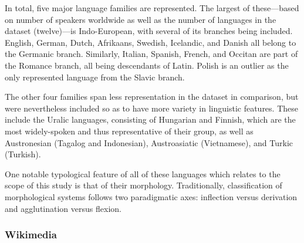 \documentclass[12pt,a4paper]{article}
\numberwithin{figure}{section}
\numberwithin{table}{section}
\numberwithin{definition}{section}
\begin{document}

In total, five major language families are represented. The largest of these---based on number of speakers worldwide as well as the number of languages in the dataset (twelve)---is Indo-European, with several of its branches being included. English, German, Dutch, Afrikaans, Swedish, Icelandic, and Danish all belong to the Germanic branch. Similarly, Italian, Spanish, French, and Occitan are part of the Romance branch, all being descendants of Latin. Polish is an outlier as the only represented language from the Slavic branch. 

The other four families span less representation in the dataset in comparison, but were nevertheless included so as to have more variety in linguistic features. These include the Uralic languages, consisting of Hungarian and Finnish, which are the most widely-spoken and thus representative of their group, as well as Austronesian (Tagalog and Indonesian), Austroasiatic (Vietnamese), and Turkic (Turkish). 

One notable typological feature of all of these languages which relates to the scope of this study is that of their morphology. Traditionally, classification of morphological systems follows two paradigmatic axes: inflection versus derivation and agglutination versus flexion.


\subsubsection{Wikimedia}
\label{ssec:wikimedia}

\end{document}
